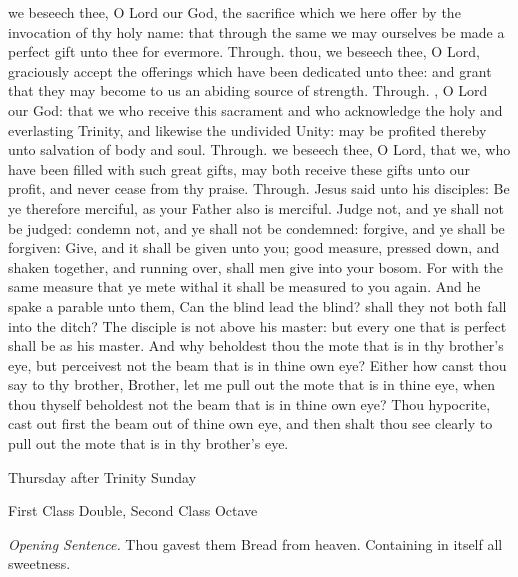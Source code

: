 \secret
{} we beseech thee, O Lord our God, the sacrifice which we here offer by the invocation of thy holy name: that through the same we may ourselves be made a perfect gift unto thee for evermore. Through.
 thou, we beseech thee, O Lord, graciously accept the offerings which have been dedicated unto thee: and grant that they may become to us an abiding source of strength. Through.
\postcommunion
{}, O Lord our God: that we who receive this sacrament and who acknowledge the holy and everlasting Trinity, and likewise the undivided Unity: may be profited thereby unto salvation of body and soul. Through.
 we beseech thee, O Lord, that we, who have been filled with such great gifts, may both receive these gifts unto our profit, and never cease from thy praise. Through.
 Jesus said unto his disciples: Be ye therefore merciful, as your Father also is merciful. Judge not, and ye shall not be judged: condemn not, and ye shall not be condemned: forgive, and ye shall be forgiven: Give, and it shall be given unto you; good measure, pressed down, and shaken together, and running over, shall men give into your bosom. For with the same measure that ye mete withal it shall be measured to you again. And he spake a parable unto them, Can the blind lead the blind? shall they not both fall into the ditch? The disciple is not above his master: but every one that is perfect shall be as his master. And why beholdest thou the mote that is in thy brother's eye, but perceivest not the beam that is in thine own eye? Either how canst thou say to thy brother, Brother, let me pull out the mote that is in thine eye, when thou thyself beholdest not the beam that is in thine own eye? Thou hypocrite, cast out first the beam out of thine own eye, and then shalt thou see clearly to pull out the mote that is in thy brother's eye.

\begin{inhead}
	{Thursday after Trinity Sunday}\par
    {First Class Double, Second Class Octave}
\end{inhead}

\textit{Opening Sentence.} Thou gavest them Bread from heaven. Containing in itself all sweetness.


